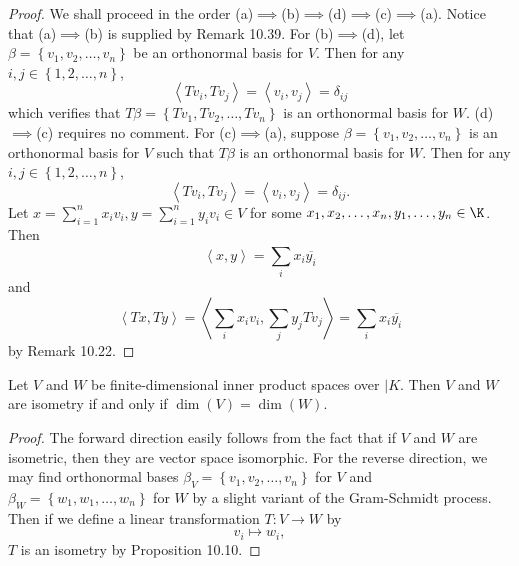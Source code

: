 \documentclass[linearalgebra]{subfiles}
\begin{document}
    \begin{proof}
        We shall proceed in the order (a)$\implies$(b)$\implies$(d)$\implies$(c)$\implies$(a). Notice that (a)$\implies$(b) is supplied by Remark 10.39. For (b)$\implies$(d), let $\beta=\left\lbrace v_1,v_2,\ldots,v_n \right\rbrace$ be an orthonormal basis for $V$. Then for any $i,j\in\left\lbrace 1,2,\ldots,n \right\rbrace$,
        \begin{equation*}
            \left\langle Tv_i, Tv_j\right\rangle = \left\langle v_i, v_j\right\rangle = \delta_{ij}
        \end{equation*}
        which verifies that $T\beta = \left\lbrace Tv_1,Tv_2,\ldots,Tv_n \right\rbrace$ is an orthonormal basis for $W$. (d)$\implies$(c) requires no comment. For (c)$\implies$(a), suppose $\beta = \left\lbrace v_1,v_2,\ldots,v_n \right\rbrace$ is an orthonormal basis for $V$ such that $T\beta$ is an orthonormal basis for $W$. Then for any $i,j\in\left\lbrace 1,2,\ldots,n \right\rbrace$,
        \begin{equation*}
            \left\langle Tv_i, Tv_j\right\rangle = \left\langle v_i, v_j\right\rangle = \delta_{ij}.
        \end{equation*}
        Let $x=\sum^{n}_{i=1} x_iv_i, y=\sum^{n}_{i=1} y_iv_i\in V$ for some $x_1,x_2,\ldots,x_n,y_1,\ldots,y_n\in\K$. Then
        \begin{equation*}
            \left\langle x, y\right\rangle = \sum^{}_{i} x_i\overline{y_i} 
        \end{equation*}
        and
        \begin{equation*}
            \left\langle Tx, Ty\right\rangle = \left\langle \sum^{}_{i} x_iv_i, \sum^{}_{j} y_jTv_j\right\rangle = \sum^{}_{i} x_i\overline{y_i} 
        \end{equation*}
        by Remark 10.22.
    \end{proof}

    \begin{cor}{}
        Let $V$ and $W$ be finite-dimensional inner product spaces over $|K$. Then $V$ and $W$ are isometry if and only if $\dim(V) = \dim(W)$.
    \end{cor}	

    \begin{proof}
        The forward direction easily follows from the fact that if $V$ and $W$ are isometric, then they are vector space isomorphic. For the reverse direction, we may find orthonormal bases $\beta_V = \left\lbrace v_1,v_2,\ldots,v_n \right\rbrace$ for $V$ and $\beta_W = \left\lbrace w_1,w_1,\ldots,w_n \right\rbrace$ for $W$ by a slight variant of the Gram-Schmidt process. Then if we define a linear transformation $T:V\to W$ by
        \begin{equation*}
            v_i\mapsto w_i,
        \end{equation*}
        $T$ is an isometry by Proposition 10.10.
    \end{proof}
\end{document}
